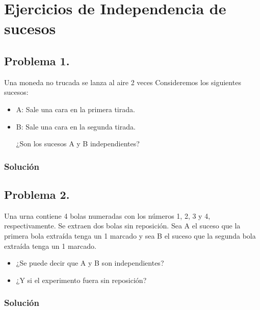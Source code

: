\documentclass[
]{article}
\providecommand{\tightlist}{%
  \setlength{\itemsep}{0pt}\setlength{\parskip}{0pt}}
\begin{document}
\hypertarget{ejercicios-de-independencia-de-sucesos}{%
\section{Ejercicios de Independencia de
sucesos}\label{ejercicios-de-independencia-de-sucesos}}

\hypertarget{problema-1.}{%
\subsection{Problema 1.}\label{problema-1.}}

Una moneda no trucada se lanza al aire 2 veces Consideremos los
siguientes sucesos:

\begin{itemize}
\item
  A: Sale una cara en la primera tirada.
\item
  B: Sale una cara en la segunda tirada.

  ¿Son los sucesos A y B independientes?
\end{itemize}

\hypertarget{soluciuxf3n-17}{%
\subsubsection{Solución}\label{soluciuxf3n-17}}

\hypertarget{problema-2.}{%
\subsection{Problema 2.}\label{problema-2.}}

Una urna contiene 4 bolas numeradas con los números 1, 2, 3 y 4,
respectivamente. Se extraen dos bolas sin reposición. Sea A el suceso
que la primera bola extraída tenga un 1 marcado y sea B el suceso que la
segunda bola extraída tenga un 1 marcado.

\begin{itemize}
\tightlist
\item
  ¿Se puede decir que A y B son independientes?
\item
  ¿Y si el experimento fuera sin reposición?
\end{itemize}

\hypertarget{soluciuxf3n-18}{%
\subsubsection{Solución}\label{soluciuxf3n-18}}
\end{document}
